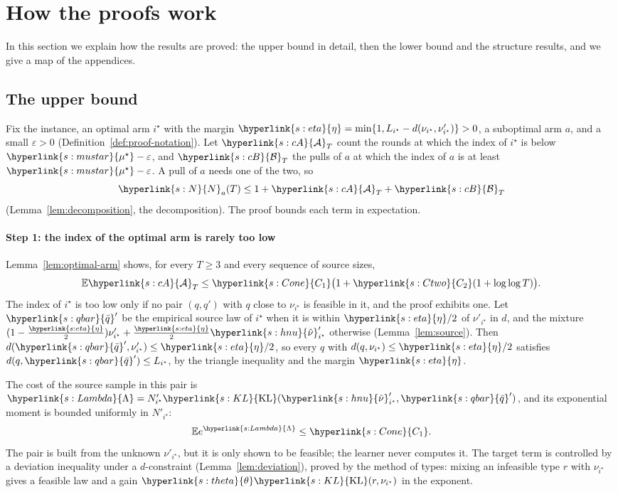 \documentclass[11pt]{article}
\newcommand{\E}{\mathbb{E}}
\newcommand{\sy}[2]{{\hyperlink{#1}{#2}}}
\newcommand{\KL}{\sy{s:KL}{\mathrm{KL}}}
\newcommand{\mus}{\sy{s:mustar}{\mu^{\star}}}
\newcommand{\Nc}{\sy{s:N}{N}}
\newcommand{\hnu}{\sy{s:hnu}{\hat\nu}}
\newcommand{\etam}{\sy{s:eta}{\eta}}
\newcommand{\thet}{\sy{s:theta}{\theta}}
\newcommand{\cA}{\sy{s:cA}{\mathcal{A}}}
\newcommand{\cB}{\sy{s:cB}{\mathcal{B}}}
\newcommand{\qbar}{\sy{s:qbar}{\bar q}}
\newcommand{\Lam}{\sy{s:Lambda}{\Lambda}}
\newcommand{\Cone}{\sy{s:Cone}{C_{1}}}
\newcommand{\Ctwo}{\sy{s:Ctwo}{C_{2}}}
\begin{document}
\section{How the proofs work}\label{sec:overview}

In this section we explain how the results are proved: the upper bound in detail, then the lower
bound and the structure results, and we give a map of the appendices.

\subsection{The upper bound}\label{sec:overview-upper}

Fix the instance, an optimal arm $i^\star$ with the margin
$\etam=\min\{1,L_{i^\star}-d(\nu_{i^\star},\nu'_{i^\star})\}>0$, a suboptimal arm $a$, and a small
$\varepsilon>0$ (Definition~\ref{def:proof-notation}). Let $\cA_T$ count the rounds at which the
index of $i^\star$ is below $\mus-\varepsilon$, and $\cB_T$ the pulls of $a$ at which the index
of $a$ is at least $\mus-\varepsilon$. A pull of $a$ needs one of the two, so
\begin{equation*}
\Nc_a(T)\le1+\cA_T+\cB_T
\end{equation*}
(Lemma~\ref{lem:decomposition}, the decomposition). The proof bounds each term in expectation.

\paragraph{Step 1: the index of the optimal arm is rarely too low} Lemma~\ref{lem:optimal-arm}
shows, for every $T\ge3$ and every sequence of source sizes,
\begin{equation*}
\E\cA_T\le\Cone\big(1+\Ctwo(1+\log\log T)\big).
\end{equation*}
The index of $i^\star$ is too low only if no pair $(q,q')$ with $q$ close to $\nu_{i^\star}$ is
feasible in it, and the proof exhibits one. Let $\qbar'$ be the empirical source law of $i^\star$
when it is within $\etam/2$ of $\nu'_{i^\star}$ in $d$, and the mixture
$(1-\frac\etam2)\nu'_{i^\star}+\frac\etam2\hnu'_{i^\star}$ otherwise (Lemma~\ref{lem:source}).
Then $d(\qbar',\nu'_{i^\star})\le\etam/2$, so every $q$ with $d(q,\nu_{i^\star})\le\etam/2$
satisfies $d(q,\qbar')\le L_{i^\star}$, by the triangle inequality and the margin $\etam$.

The cost of the source sample in this pair is $\Lam=N'_{i^\star}\KL(\hnu'_{i^\star},\qbar')$,
and its exponential moment is bounded uniformly in $N'_{i^\star}$:
\begin{equation*}
\E e^{\Lam}\le\Cone .
\end{equation*}
The pair is built from the unknown $\nu'_{i^\star}$, but it is only shown to be feasible; the
learner never computes it. The target term is controlled by a deviation inequality under a
$d$-constraint (Lemma~\ref{lem:deviation}), proved by the method of types: mixing an infeasible type
$r$ with $\nu_{i^\star}$ gives a feasible law and a gain $\thet\KL(r,\nu_{i^\star})$ in the exponent.
\end{document}
